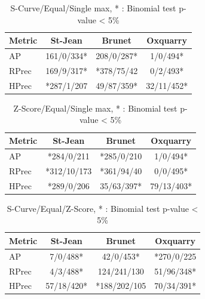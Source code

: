 \begin{table}[h]
  \caption{S-Curve/Equal/Single max,  * : Binomial test p-value < 5\%}
  \centering
  \label{}
  \begin{tabular}{l c c c}
    \toprule
    Metric & St-Jean  & Brunet & Oxquarry \\ \midrule
    AP     & 161/0/334* & 208/0/287* & 1/0/494*\\
    RPrec  & 169/9/317* & *378/75/42 & 0/2/493*\\
    HPrec  & *287/1/207 & 49/87/359* & 32/11/452*\\
    \bottomrule
  \end{tabular}
\end{table}

\begin{table}[h]
  \caption{Z-Score/Equal/Single max,  * : Binomial test p-value < 5\%}
  \centering
  \label{}
  \begin{tabular}{l c c c}
    \toprule
    Metric& St-Jean  & Brunet & Oxquarry \\ \midrule
    AP    & *284/0/211  & *285/0/210 & 1/0/494*\\
    RPrec & *312/10/173 & *361/94/40 & 0/0/495*\\
    HPrec & *289/0/206  & 35/63/397* & 79/13/403*\\
    \bottomrule
  \end{tabular}
\end{table}

\begin{table}[h]
  \caption{S-Curve/Equal/Z-Score,  * : Binomial test p-value < 5\%}
  \centering
  \label{}
  \begin{tabular}{l c c c}
    \toprule
    Metric & St-Jean & Brunet & Oxquarry \\ \midrule
    AP     & 7/0/488*   & 42/0/453*    & *270/0/225\\
    RPrec  & 4/3/488*   & 124/241/130  & 51/96/348*\\
    HPrec  & 57/18/420* & *188/202/105 & 70/34/391*\\
    \bottomrule
  \end{tabular}
\end{table}

